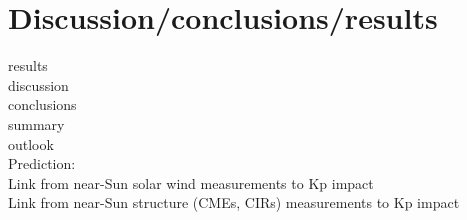 \chapter[Discussion and results]{Discussion/conclusions/results}


results\\
discussion\\
conclusions\\
summary\\
outlook\\

Prediction:\\
Link from near-Sun solar wind measurements to Kp impact\\
Link from near-Sun structure (CMEs, CIRs) measurements to Kp impact\\
